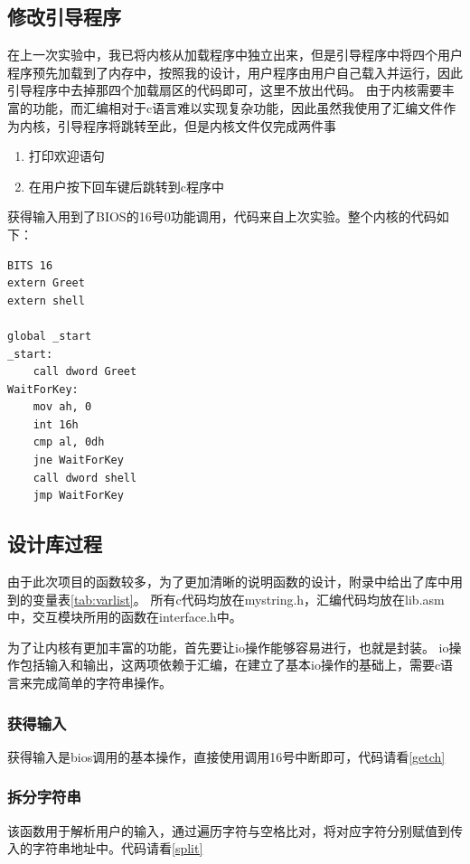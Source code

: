 \documentclass[a4paper, 11pt]{article} %
\begin{document}
\subsection{修改引导程序}
在上一次实验中，我已将内核从加载程序中独立出来，但是引导程序中将四个用户程序预先加载到了内存中，按照我的设计，用户程序由用户自己载入并运行，因此引导程序中去掉那四个加载扇区的代码即可，这里不放出代码。
由于内核需要丰富的功能，而汇编相对于c语言难以实现复杂功能，因此虽然我使用了汇编文件作为内核，引导程序将跳转至此，但是内核文件仅完成两件事
\begin{enumerate}
  \item 打印欢迎语句
  \item 在用户按下回车键后跳转到c程序中
\end{enumerate}
获得输入用到了BIOS的16号0功能调用，代码来自上次实验。整个内核的代码如下：
\begin{lstlisting}[language={[x86masm]Assembler},label=kernel.asm,caption=kernel.asm]
BITS 16
extern Greet
extern shell

global _start
_start:
    call dword Greet
WaitForKey:
    mov ah, 0
    int 16h
    cmp al, 0dh   
    jne WaitForKey
    call dword shell
    jmp WaitForKey
\end{lstlisting}
  

\subsection{设计库过程}

由于此次项目的函数较多，为了更加清晰的说明函数的设计，附录中给出了库中用到的变量表\ref{tab:varlist}。
所有c代码均放在mystring.h，汇编代码均放在lib.asm中，交互模块所用的函数在interface.h中。

为了让内核有更加丰富的功能，首先要让io操作能够容易进行，也就是封装。
io操作包括输入和输出，这两项依赖于汇编，在建立了基本io操作的基础上，需要c语言来完成简单的字符串操作。

\subsubsection{获得输入}
获得输入是bios调用的基本操作，直接使用调用16号中断即可，代码请看\ref{getch}

\subsubsection{拆分字符串}
该函数用于解析用户的输入，通过遍历字符与空格比对，将对应字符分别赋值到传入的字符串地址中。代码请看\ref{split}
\end{document}
